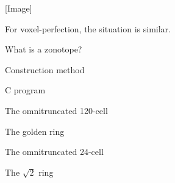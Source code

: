 \documentclass{article}
\begin{document}
[Image]

For voxel-perfection, the situation is similar.

What is a zonotope?

Construction method

C program

The omnitruncated 120-cell

The golden ring

The omnitruncated 24-cell

The $\sqrt{2}$ ring
\end{document}
